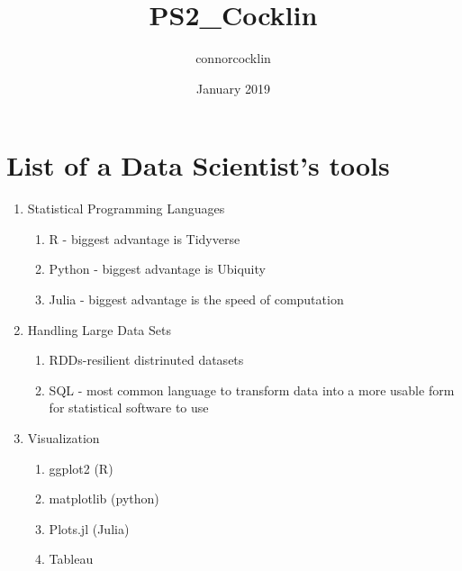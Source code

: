 \documentclass{article}
\title{PS2_Cocklin}
\author{connorcocklin }
\date{January 2019}
\begin{document}
\maketitle

\section{List of a Data Scientist's tools}
\begin{enumerate}
    \item Statistical Programming Languages
    \begin{enumerate}
        \item R - biggest advantage is Tidyverse
        \item Python - biggest advantage is Ubiquity
        \item Julia - biggest advantage is the speed of computation
        \end{enumerate}
    \item Handling Large Data Sets
    \begin{enumerate}
        \item RDDs-resilient distrinuted datasets
        \item SQL - most common language to transform data into a more usable form for statistical software to use
    \end{enumerate}
    \item Visualization
    \begin{enumerate}
        \item ggplot2 (R)
        \item matplotlib (python)
        \item Plots.jl (Julia)
        \item Tableau
    \end{enumerate}
\end{enumerate}
\end{document}
